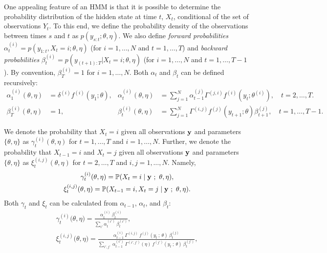 One appealing feature of an HMM is that it is possible to determine the probability distribution of the hidden state at time $t$, $X_t$, conditional of the set of observations $Y_t$. To this end, we define the probability density of the observations between times $s$ and $t$ as $p(y_{s:t};\theta,\eta)$. We also define \textit{forward probabilities} $\alpha^{(i)}_t = p(y_{1:t},X_t = i;\theta,\eta)$ (for $i = 1,\ldots,N$ and $t = 1,\ldots,T$) and \textit{backward probabilities} $\beta^{(i)}_t = p(y_{(t+1):T}|X_t = i;\theta,\eta)$ (for $i = 1,\ldots,N$ and $t = 1,\ldots,T-1$). By convention, $\beta^{(i)}_T = 1$ for $i = 1,\ldots,N$. 
Both $\alpha_t$ and $\beta_t$ can be defined recursively:
%
\begin{align}
    \alpha_1^{(i)}(\theta,\eta) &= \delta^{(i)} f^{(i)}(y_1;\theta), & \alpha_t^{(i)}(\theta,\eta) &= \sum_{j=1}^N \alpha_{t-1}^{(j)} \Gamma^{(j,i)} f^{(i)}(y_t;\theta^{(i)}), \quad t = 2,\ldots,T. \label{eqn:alpha} \\
    \beta_T^{(i)}(\theta,\eta) &= 1, & \beta_t^{(i)}(\theta,\eta) &= \sum_{j=1}^N \Gamma^{(i,j)} f^{(j)}(y_{t+1};\theta) \beta^{(j)}_{t+1}, \quad t = 1,\ldots,T-1. \label{eqn:beta}
\end{align}

We denote the probability that $X_t = i$ given all observations $\mathbf{y}$ and parameters $\{\theta,\eta\}$ as $\gamma_t^{(i)}(\theta,\eta)$ for $t = 1,\ldots,T$ and $i = 1,\ldots,N$. Further, we denote the probability that $X_{t-1} = i$ and $X_t = j$ given all observations $\mathbf{y}$ and parameters $\{\theta,\eta\}$ as $\xi_t^{(i,j)}(\theta,\eta)$ for $t = 2,\ldots,T$ and $i,j = 1,\ldots,N$. Namely,
%
\begin{gather*}
    \gamma_t^{(i)}(\theta,\eta) = \mathbb{P}(X_t = i \mid \mathbf{y} ~;~ \theta,\eta), \\ \xi_t^{(i,j)}(\theta,\eta) = \mathbb{P}(X_{t-1} = i, X_t = j \mid \mathbf{y} ~;~ \theta,\eta). \nonumber
\end{gather*}
%
Both $\gamma_t$ and $\xi_t$ can be calculated from $\alpha_{t-1}$, $\alpha_t$, and $\beta_t$:
%
\begin{gather}
    \gamma_{t}^{(i)}\big(\theta,\eta\big) = \frac{\alpha_{t}^{(i)} ~ \beta_{t}^{(i)}}{\sum_{i'} \alpha_{t}^{(i')} ~ \beta_{t}^{(i')}}, \label{eqn:gamma} \\
    \xi_{t}^{(i,j)}\big(\theta, \eta) = \frac{\alpha_{t-1}^{(i)} ~ \Gamma^{(i,j)} ~ f^{(j)}(y_{t} ~ ; ~\theta) ~ \beta_{t}^{(j)}}{\sum_{i',j'} ~ \alpha_{t-1}^{(i')} ~ \Gamma^{(i',j')}(\eta) ~ f^{(j')}(y_{t} ~ ; ~\theta) ~ \beta_{t}^{(j')}} \label{eqn:xi},
\end{gather}

